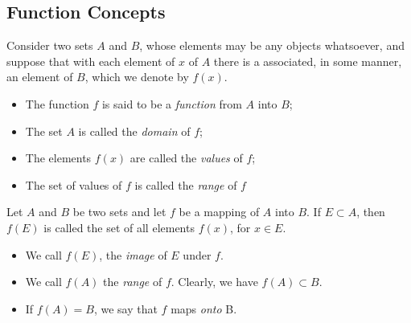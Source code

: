 \documentclass[11pt,a4paper]{book}
\begin{document}
\subsection{Function Concepts}

\begin{definition}
    Consider two sets \( A  \) and \( B  \), whose elements may be any objects whatsoever, and suppose that with each element of \( x  \) of \( A  \) there is a associated, in some manner, an element of \( B  \), which we denote by \( f(x) \).
   \begin{itemize}
       \item The function \( f  \) is said to be a \textit{function} from \( A  \) into \( B  \);
        \item The set \( A  \) is called the \textit{domain} of \( f  \); 
        \item The elements \( f(x) \) are called the \textit{values} of \( f  \);
        \item The set of values of \( f  \) is called the \textit{range} of \( f  \)
   \end{itemize} 
\end{definition}

\begin{definition}
   Let \( A  \) and \( B  \) be two sets and let \( f  \) be a mapping of \( A  \) into \( B  \). If \( E \subset A  \), then \( f(E)  \) is called the set of all elements \( f(x) \), for \( x \in E \). 
   \begin{itemize}
       \item We call \( f(E)  \), the \textit{image} of \( E  \) under \( f  \).  
        \item We call \( f(A) \) the \textit{range} of \( f  \). Clearly, we have \( f(A) \subset B  \).
        \item If \( f(A) = B  \), we say that \( f  \) maps \textit{onto} B.
   \end{itemize}
\end{definition}
\end{document}
